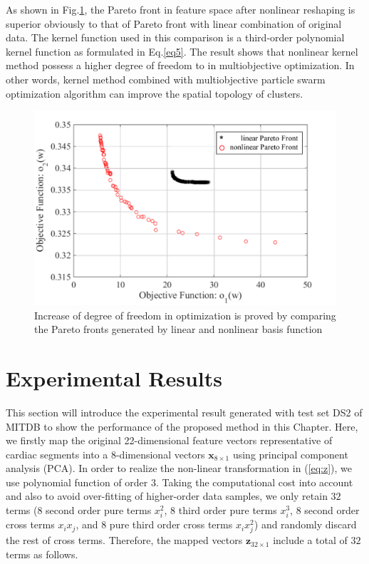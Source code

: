 As shown in Fig.\ref{fig:pareto_compare}, the Pareto front in feature space after nonlinear reshaping is superior obviously to that of Pareto front with linear combination of original data. The kernel function used in this comparison is a third-order polynomial kernel function as formulated in Eq.\ref{eq5}. The result shows that nonlinear kernel method possess a higher degree of freedom to in multiobjective optimization. In other words, kernel method combined with multiobjective particle swarm optimization algorithm can improve the spatial topology of clusters.

\begin{figure}[t]
\centering
\includegraphics[scale=.6]{Fig/pareto_compare.pdf}
\caption{Increase of degree of freedom in optimization is proved by comparing the Pareto fronts generated by linear and nonlinear basis function}
\label{fig:pareto_compare}
\end{figure}

\section{Experimental Results}\label{sec:result1}

This section will introduce the experimental result generated with test set DS2 of MITDB to show the performance of the proposed method in this Chapter. Here, we firstly map the original 22-dimensional feature vectors representative of cardiac segments into a 8-dimensional vectors $\mathbf{x}_{8 \times 1}$ using principal component analysis (PCA). 
In order to realize the non-linear transformation in (\ref{eq:z}), we use polynomial function of order $3$. Taking the computational cost into account and also to avoid over-fitting of higher-order data samples, we only retain $32$ terms (8 second order pure terms $x_i^2$, 8 third order pure terms $x_i^3$, 8 second order cross terms $x_ix_j$, and 8 pure third order cross terms $x_i x_j^2$) and randomly discard the rest of cross terms. Therefore, the mapped vectors $\mathbf{z}_{32 \times 1}$ include a total of $32$ terms as follows.

